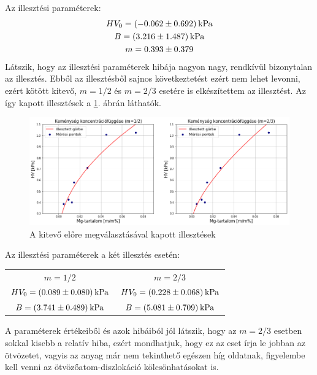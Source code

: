 \documentclass[12pt,a4paper]{article}
\begin{document}
\newline
Az illesztési paraméterek:
\begin{gather*}
HV_0=(-0.062\pm 0.692) \hspace*{2pt}  \textrm{kPa}\\
B=(3.216\pm 1.487) \hspace*{2pt} \textrm{kPa}\\
m=0.393 \pm 0.379
\end{gather*}
Látszik, hogy az illesztési paraméterek hibája nagyon nagy, rendkívül bizonytalan az illesztés. Ebből az illesztésből sajnos következtetést ezért nem lehet levonni, ezért kötött kitevő, $m=1/2$ és $m=2/3$ esetére is elkészítettem az illesztést. Az így kapott illesztések a \ref{fig:fit2}. ábrán láthatók.\\
\begin{figure}[!h]
\centering
\includegraphics[scale=0.42]{illesztes}
\caption{A kitevő előre megválasztásával kapott illesztések}
\label{fig:fit2}
\end{figure}
\newline
Az illesztési paraméterek a két illesztés esetén:\\
\begin{table}[!h]
\begin{center}
\begin{tabular}{c c}
$m=1/2$ & $m=2/3$ \\
$HV_0=(0.089\pm 0.080) \hspace*{2pt}  \textrm{kPa}$ & $HV_0=(0.228\pm 0.068) \hspace*{2pt}  \textrm{kPa}$\\
$B=(3.741\pm 0.489) \hspace*{2pt} \textrm{kPa}$ & $B=(5.081\pm 0.709) \hspace*{2pt} \textrm{kPa}$\\
\end{tabular}
\end{center}
\end{table}
\newline
A paraméterek értékeiből és azok hibáiból jól látszik, hogy az $m=2/3$ esetben sokkal kisebb a relatív hiba, ezért mondhatjuk, hogy ez az eset írja le jobban az ötvözetet, vagyis az anyag már nem tekinthető egészen híg oldatnak, figyelembe kell venni az ötvözőatom-diszlokáció kölcsönhatásokat is.
\end{document}
